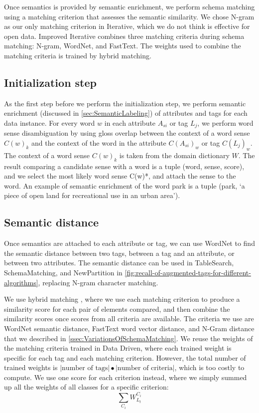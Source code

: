 Once semantics is provided by semantic enrichment, we perform schema matching using a matching criterion that assesses the semantic similarity. We chose N-gram as our only matching criterion in Iterative, which we do not think is effective for open data. Improved Iterative combines three matching criteria during schema matching: N-gram, WordNet, and FastText. The weights used to combine the matching criteria is trained by hybrid matching.

\subsection{Initialization step}

As the first step before we perform the initialization step, we perform semantic enrichment (discussed in \autoref{sec:SemanticLabeling}) of attributes and tags for each data instance. For every word $w$ in each attribute $A_{si}$ or tag $L_j$, we perform word sense disambiguation by using gloss overlap between the context of a word sense $C(w)_k$ and the context of the word in the attribute $C(A_{si})_w$ or tag $C(L_j)_w$. The context of a word sense $C(w)_k$ is taken from the domain dictionary $W$. The result comparing a candidate sense with a word is a tuple (word, sense, score), and we select the most likely word sense C(w)*, and attach the sense to the word. An example of semantic enrichment of the word park is a tuple (park, `a piece of open land for recreational use in an urban area').

\subsection{Semantic distance}

Once semantics are attached to each attribute or tag, we can use WordNet to find the semantic distance between two tags, between a tag and an attribute, or between two attributes. The semantic distance can be used in TableSearch, SchemaMatching, and NewPartition in \autoref{fig:recall-of-augmented-tags-for-different-algorithms}, replacing N-gram character matching.

We use hybrid matching \cite{Rahm2001Survey}, where we use each matching criterion to produce a similarity score for each pair of elements compared, and then combine the similarity scores once scores from all criteria are available. The criteria we use are WordNet semantic distance, FastText word vector distance, and N-Gram distance that we described in \autoref{ssec:VariationsOfSchemaMatching}. We reuse the weights of the matching criteria trained in Data Driven, where each trained weight is specific for each tag and each matching criterion. However, the total number of trained weights is $|\text{number of tags}|\bullet|\text{number of criteria}|$, which is too costly to compute. We use one score for each criterion instead, where we simply summed up all the weights of all classes for a specific criterion:
\[
\sum_{C_{i}}\ensuremath{W}_{L_{t}}^{C_{i}}
\]

